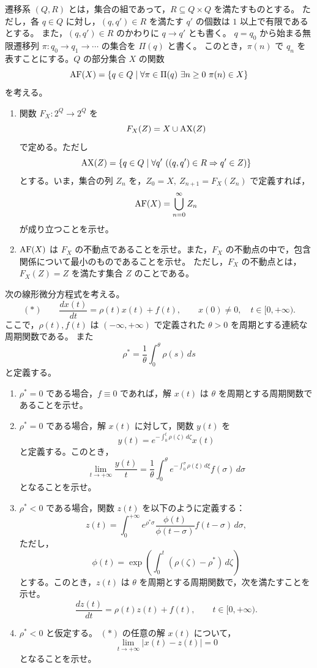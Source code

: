 遷移系 \((Q,R)\) とは，集合の組であって，\(R\subseteq Q\times Q\) を満たすものとする。
ただし，各 \(q\in Q\) に対し，\((q,q')\in R\) を満たす \(q'\) の個数は \(1\) 以上で有限であるとする。
また，\((q,q')\in R\) のかわりに \(q\to q'\) とも書く。
\(q=q_0\) から始まる無限遷移列 \(\pi:q_0\to q_1\to\cdots\) の集合を \(\Pi(q)\) と書く。
このとき，\(\pi(n)\) で \(q_n\) を表すことにする。\(Q\) の部分集合 \(X\) の関数
\[
  \operatorname{AF}(X)=\{q\in Q\mid \forall \pi\in\Pi(q)\ \exists n\ge0\ \pi(n)\in X\}
\]
を考える。

\begin{enumerate}
  \item 関数 \(F_X:2^Q\to 2^Q\) を
  \[
    F_X(Z)=X\cup \operatorname{AX}(Z)
  \]
  で定める。ただし
  \[
    \operatorname{AX}(Z)=\{q\in Q\mid \forall q'\ ((q,q')\in R\Rightarrow q'\in Z)\}
  \]
  とする。いま，集合の列 \(Z_n\) を，\(Z_0=X,\ Z_{n+1}=F_X(Z_n)\) で定義すれば，
  \[
    \operatorname{AF}(X)=\bigcup_{n=0}^{\infty}Z_n
  \]
  が成り立つことを示せ。
  \item \(\operatorname{AF}(X)\) は \(F_X\) の不動点であることを示せ。また，\(F_X\) の不動点の中で，包含関係について最小のものであることを示せ。
  ただし，\(F_X\) の不動点とは，\(F_X(Z)=Z\) を満たす集合 \(Z\) のことである。
\end{enumerate}


次の線形微分方程式を考える。
\[
  (*)\qquad
  \frac{dx(t)}{dt}=\rho(t)x(t)+f(t),\qquad
  x(0)\ne0,\quad t\in[0,+\infty).
\]
ここで，\(\rho(t),f(t)\) は \((-\infty,+\infty)\) で定義された \(\theta>0\) を周期とする連続な周期関数である。
また
\[
  \rho^*=\frac1\theta\int_0^\theta \rho(s)\,ds
\]
と定義する。

\begin{enumerate}
  \item \(\rho^*=0\) である場合，\(f\equiv0\) であれば，解 \(x(t)\) は \(\theta\) を周期とする周期関数であることを示せ。
  \item \(\rho^*=0\) である場合，解 \(x(t)\) に対して，関数 \(y(t)\) を
  \[
    y(t)=e^{-\int_0^t\rho(\zeta)\,d\zeta}x(t)
  \]
  と定義する。このとき，
  \[
    \lim_{t\to+\infty}\frac{y(t)}{t}
      =\frac1\theta\int_0^\theta
      e^{-\int_0^\sigma \rho(\xi)\,d\xi}f(\sigma)\,d\sigma
  \]
  となることを示せ。
  \item \(\rho^*<0\) である場合，関数 \(z(t)\) を以下のように定義する：
  \[
    z(t)=\int_0^{+\infty}
      e^{\rho^*\sigma}\frac{\phi(t)}{\phi(t-\sigma)}f(t-\sigma)\,d\sigma,
  \]
  ただし，
  \[
    \phi(t)=\exp\left(\int_0^t(\rho(\zeta)-\rho^*)\,d\zeta\right)
  \]
  とする。このとき，\(z(t)\) は \(\theta\) を周期とする周期関数で，次を満たすことを示せ。
  \[
    \frac{dz(t)}{dt}=\rho(t)z(t)+f(t),\qquad t\in[0,+\infty).
  \]
  \item \(\rho^*<0\) と仮定する。 \((*)\) の任意の解 \(x(t)\) について，
  \[
    \lim_{t\to+\infty}|x(t)-z(t)|=0
  \]
  となることを示せ。
\end{enumerate}

